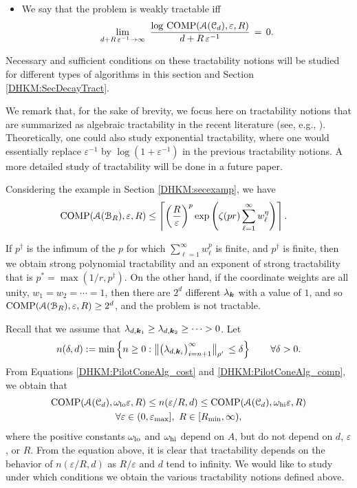 \documentclass[USenglish]{article}
\theoremstyle{dgthm}
\theoremstyle{dgthm}
\theoremstyle{dgthm}
\theoremstyle{dgthm}
\theoremstyle{dgdef}
\theoremstyle{definition}
\DeclareMathOperator{\COMP}{COMP}
\newcommand{\bignorm}[2][{}]{\ensuremath{\bigl \lVert #2 \bigr \rVert}_{#1}}
\begin{document}
{\begin{itemize}
   
\item   
We say that the problem is weakly tractable iff    
$$   
\lim_{d+R\,\varepsilon^{-1}\to\infty}\   
\frac{\log\, \COMP(\calA(\calC_d), \varepsilon,R)}   
{d+R\,\varepsilon^{-1}}\,=\,0.   
$$    
\end{itemize}   

Necessary and sufficient conditions on these tractability notions will be studied 
for different types of algorithms in this section and Section \ref{DHKM:SecDecayTract}. 

We remark that, for the sake of brevity, we focus here on tractability notions that are summarized as 
algebraic tractability in the recent literature 
(see, e.g., \cite{KriWoz19}). Theoretically, one could also study exponential tractability, where 
one would essentially replace $\varepsilon^{-1}$ 
by $\log (1 + \varepsilon^{-1})$ in the previous tractability notions. A more detailed study of 
tractability will be done in a future paper.

Considering the example in Section \ref{DHKM:secexamp}, we have
\begin{align*}
    \MoveEqLeft{\COMP(\calA(\calB_{R}),\varepsilon,R)} 
  \le \left \lceil \left( \frac{R}{\varepsilon} \right)^{p}  \exp\left(\zeta(p r) \sum_{\ell = 1}^{\infty} w_\ell^{\eta} \right) \right \rceil .
\end{align*}

If $p^\dagger$ is the infimum of the $p$ for which $\sum_{\ell = 1}^{\infty} w_\ell^{p}$ is finite, and $p^\dagger$ is finite, then we obtain strong polynomial tractability and an exponent of strong tractability that is $p^* = \max(1/r,p^\dagger)$. On the other hand, if the coordinate weights are all unity,  $w_1 = w_2 = \cdots = 1$, then there are $2^d$ different $\lambda_{{\boldsymbol{k}}}$ with a value of $1$, and so $\COMP(\calA(\calB_{R}),\varepsilon,R) \ge 2^d$, and the problem is not tractable.\\

}

Recall that we assume that 
$\lambda_{d,{\boldsymbol{k}}_1}\geq \lambda_{d,{\boldsymbol{k}}_2}\geq \cdots >0$. Let 
\[
n(\delta,d) :=\min \left \{n\ge 0: \bignorm[\rho']{\bigl(  \lambda_{d,\bsk_i}  \bigr)_{i = n+1}^{\infty}} \,
    \le \delta \right \} \qquad \forall \delta > 0.
\]
From 
Equations \eqref{DHKM:PilotConeAlg_cost} and \eqref{DHKM:PilotConeAlg_comp}, we obtain that 
\begin{multline*}
     \COMP(\calA(\calC_d),\omega_{\textup{lo}} \varepsilon,R) \le n(\varepsilon/R,d) \le 
        \COMP(\calA(\calC_d),\omega_{\textup{hi}} \varepsilon,R)  \\
        \forall \varepsilon \in (0, \varepsilon_{\max}], \ R \in [R_{\min}, \infty),
\end{multline*}
where the positive constants $\omega_{\textup{lo}}$ and $\omega_{\textup{hi}}$  depend on $A$, but do not depend on $d$, $\varepsilon$, or $R$.  From the equation above, it is clear that tractability depends on the behavior of $n(\varepsilon/R,d)$ as $R/\varepsilon$ and $d$ tend to infinity. We would like to study under which conditions we obtain the various tractability notions defined above.
\end{document}
